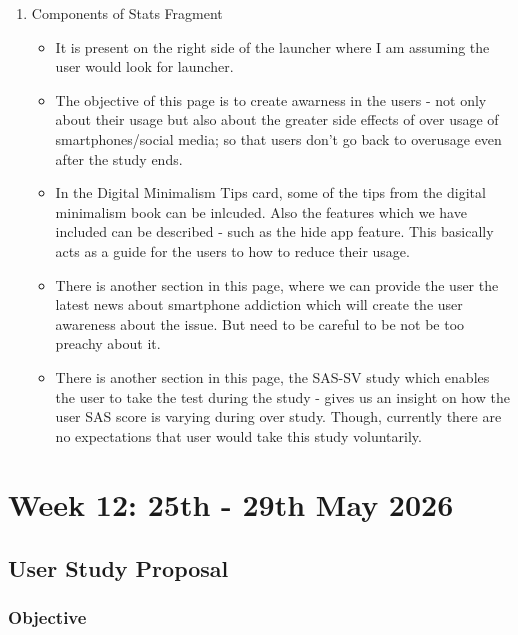 \documentclass{article}
\begin{document}
\begin{enumerate}
    Reason : Observation is that in most of the applications right click is for forward and left click is for backward. And most of the launchers are also present on the left side. So a small tweak to that to add some more friction.
    \item Components of Stats Fragment
    \begin{itemize}
        \item It is present on the right side of the launcher where I am assuming the user would look for launcher.
        \item The objective of this page is to create awarness in the users - not only about their usage but also about the greater side effects of over usage of smartphones/social media; so that users don't go back to overusage even after the study ends. 
        \item In the Digital Minimalism Tips card, some of the tips from the digital minimalism book can be inlcuded. Also the features which we have included can be described - such as the hide app feature. This basically acts as a guide for the users to how to reduce their usage.
        \item There is another section in this page, where we can provide the user the latest news about smartphone addiction which will create the user awareness about the issue. But need to be careful to be not be too preachy about it.
        \item There is another section in this page, the SAS-SV study which enables the user to take the test during the study - gives us an insight on how the user SAS score is varying during over study. Though, currently there are no expectations that user would take this study voluntarily.
    \end{itemize}
\end{enumerate}


\newpage
\section{Week 12: 25th - 29th May 2026}


\subsection{User Study Proposal}
\subsubsection{Objective}

\textbf{}
\end{document}
